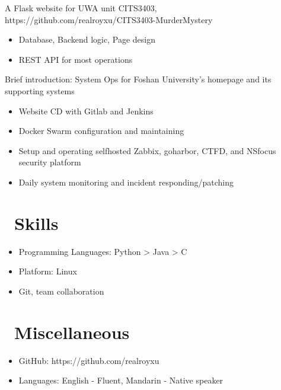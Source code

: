 \documentclass{resume}
\begin{document}
A Flask website for UWA unit CITS3403, https://github.com/realroyxu/CITS3403-MurderMystery
\begin{itemize}
  \item Database, Backend logic, Page design
  \item REST API for most operations
\end{itemize}

Brief introduction: System Ops for Foshan University's homepage and its supporting systems
\begin{itemize}
  \item Website CD with Gitlab and Jenkins
  \item Docker Swarm configuration and maintaining
  \item Setup and operating selfhosted Zabbix, goharbor, CTFD, and NSfocus security platform
  \item Daily system monitoring and incident responding/patching
\end{itemize}


\section{\faCogs\ Skills}
\begin{itemize}[parsep=0.5ex]
  \item Programming Languages: Python > Java > C
  \item Platform: Linux
  \item Git, team collaboration
\end{itemize}


\section{\faInfo\ Miscellaneous}
\begin{itemize}[parsep=0.5ex]
  \item GitHub: https://github.com/realroyxu
  \item Languages: English - Fluent, Mandarin - Native speaker
\end{itemize}
\end{document}
